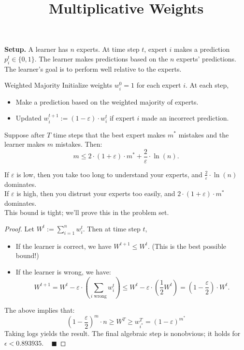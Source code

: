 \title{Multiplicative Weights}



\textbf{Setup.} A learner has $n$ experts.  At time step $t$, expert $i$ makes a prediction $p_i^t \in \{0, 1\}$.  The learner makes predictions based on the $n$ experts' predictions.  The learner's goal is to perform well relative to the experts.

\begin{solution}{Weighted Majority}
    Initialize weights $w_i^0 = 1$ for each expert $i$.  At each step,
    \begin{itemize}
        \item Make a prediction based on the weighted majority of experts.
        \item Updated $w_i^{t + 1} := (1 - \varepsilon) \cdot w_i^t$ if expert $i$ made an incorrect prediction.
    \end{itemize}
    Suppose after $T$ time steps that the best expert makes $m^*$ mistakes and the learner makes $m$ mistakes.  Then:
    \[ m \leq 2 \cdot (1 + \varepsilon) \cdot m^* + \frac{2}{\varepsilon} \cdot \ln (n). \]
\end{solution}

\begin{remark}
    If $\varepsilon$ is low, then you take too long to understand your experts, and $\frac{2}{\varepsilon} \cdot \ln(n)$ dominates. \\
    If $\varepsilon$ is high, then you distrust your experts too easily, and $2 \cdot (1 + \varepsilon) \cdot m^*$ dominates. \\
    This bound is tight; we'll prove this in the problem set.
\end{remark}

\begin{proof}
    Let $W^t := \sum_{i = 1}^n w_i^t$.  Then at time step $t$,
    \begin{itemize}
        \item If the learner is correct, we have $W^{t + 1} \leq W^t$.  (This is the best possible bound!)
        \item If the learner is wrong, we have:
        \[ W^{t + 1} = W^t - \varepsilon \cdot \left(\sum_{i \text{ wrong}} w_i^t \right) \leq W^t - \varepsilon \cdot \left(\frac{1}{2}W^t\right) = \left(1 - \frac{\varepsilon}{2}\right) \cdot W^t. \]
    \end{itemize}
    The above implies that:
    \[ \left(1 - \dfrac{\varepsilon}{2}\right)^m \cdot n \geq W^T \geq w_{i^*}^T = (1 - \varepsilon)^{m^*}  \]
    Taking logs yields the result.  The final algebraic step is nonobvious; it holds for $\epsilon < 0.893935$.  ~ $\blacksquare$
\end{proof}

